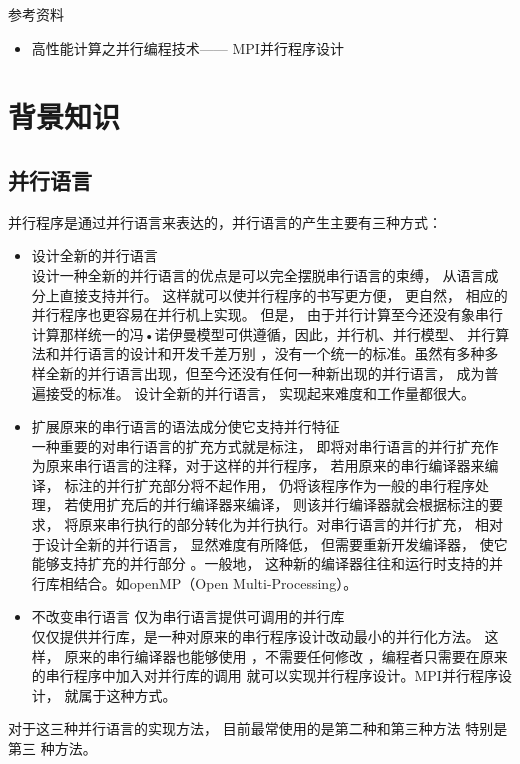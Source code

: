 参考资料
\begin{itemize}
\item  高性能计算之并行编程技术—— MPI并行程序设计
\end{itemize}
\chapter{背景知识}
\section{并行语言}
并行程序是通过并行语言来表达的，并行语言的产生主要有三种方式：
\begin{itemize}
\item 设计全新的并行语言\\
设计一种全新的并行语言的优点是可以完全摆脱串行语言的束缚， 从语言成分上直接支持并行。 这样就可以使并行程序的书写更方便， 更自然， 相应的并行程序也更容易在并行机上实现。 但是， 由于并行计算至今还没有象串行计算那样统一的冯•诺伊曼模型可供遵循，因此，并行机、并行模型、 并行算法和并行语言的设计和开发千差万别 ，没有一个统一的标准。虽然有多种多样全新的并行语言出现，但至今还没有任何一种新出现的并行语言， 成为普遍接受的标准。 设计全新的并行语言， 实现起来难度和工作量都很大。
\item 扩展原来的串行语言的语法成分使它支持并行特征\\
一种重要的对串行语言的扩充方式就是标注， 即将对串行语言的并行扩充作为原来串行语言的注释，对于这样的并行程序， 若用原来的串行编译器来编译， 标注的并行扩充部分将不起作用， 仍将该程序作为一般的串行程序处理， 若使用扩充后的并行编译器来编译， 则该并行编译器就会根据标注的要求， 将原来串行执行的部分转化为并行执行。对串行语言的并行扩充， 相对于设计全新的并行语言， 显然难度有所降低， 但需要重新开发编译器， 使它能够支持扩充的并行部分 。一般地， 这种新的编译器往往和运行时支持的并行库相结合。如openMP（Open Multi-Processing）。
\item 不改变串行语言 仅为串行语言提供可调用的并行库\\
仅仅提供并行库，是一种对原来的串行程序设计改动最小的并行化方法。 这样， 原来的串行编译器也能够使用 ，不需要任何修改 ，编程者只需要在原来的串行程序中加入对并行库的调用 就可以实现并行程序设计。MPI并行程序设计， 就属于这种方式。
\end{itemize}  
对于这三种并行语言的实现方法， 目前最常使用的是第二种和第三种方法 特别是第三
种方法。










